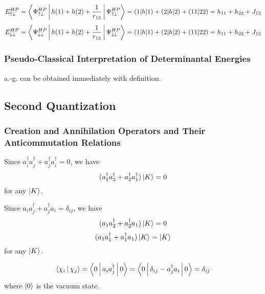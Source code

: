 \documentclass[a4paper]{article}
\begin{document}
\begin{equation}\label{key}
E_{\uparrow\downarrow}^{HP} = \Braket{\Psi_{\uparrow\downarrow}^{HP} | h(1) + h(2) + \dfrac{1}{r_{12}} | \Psi_{\uparrow\downarrow}^{HP}} = (1|h|1)+(2|h|2)+(11|22) = h_{11}+h_{22}+J_{12}
\end{equation}
\begin{equation}\label{key}
E_{\downarrow\downarrow}^{HP} = \Braket{\Psi_{\downarrow\downarrow}^{HP} | h(1) + h(2) + \dfrac{1}{r_{12}} | \Psi_{\downarrow\downarrow}^{HP}} = (1|h|1)+(2|h|2)+(11|22) = h_{11}+h_{22}+J_{12}
\end{equation}

\subsubsection{Pseudo-Classical Interpretation of Determinantal Energies}
a.-g. can be obtained immediately with definition.

\subsection{Second Quantization}
\subsubsection{Creation and Annihilation Operators and Their Anticommutation Relations}
Since $ a_i^\dagger a_j^\dagger + a_j^\dagger a_i^\dagger = 0 $, we have
\begin{equation}\label{key}
(a_1^\dagger a_2^\dagger + a_2^\dagger a_1^\dagger)\ket{K} = 0
\end{equation}
for any $ \ket{K} $.

Since $ a_i a_j^\dagger + a_j^\dagger a_i = \delta_{ij} $, we have
\begin{equation}\label{key}
(a_1 a_2^\dagger + a_2^\dagger a_1)\ket{K} = 0
\end{equation}
\begin{equation}\label{key}
(a_1 a_1^\dagger + a_1^\dagger a_1)\ket{K} = \ket{K}
\end{equation}
for any $ \ket{K} $.

\begin{equation}\label{key}
\Braket{\chi_i|\chi_j} = \Braket{0 | a_i a_j^\dagger | 0} = \Braket{0 | \delta_{ij} - a_j^\dagger a_i | 0} = \delta_{ij}
\end{equation}
where $ \ket{0} $ is the vacuum state.
\end{document}
